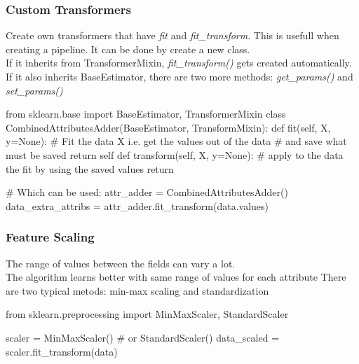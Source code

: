     \subsubsection*{Custom Transformers}
      Create own transformers that have \emph{fit} and \emph{fit\_transform}. This is usefull when creating a pipeline. It can be done by create a new class.\\
      If it inherits from TransformerMixin, \emph{fit\_transform()} gets created automatically.
      If it also inherits BaseEstimator, there are two more methods: \emph{get\_params()} and \emph{set\_params()}

      \begin{python}
        from sklearn.base import BaseEstimator, TransformerMixin
        class CombinedAttributesAdder(BaseEstimator, TransformMixin):
        def fit(self, X, y=None):
          # Fit the data X i.e. get the values out of the data
          # and save what must be saved
          return self
          def transform(self, X, y=None):
          # apply to the data the fit by using the saved values
          return

          # Which can be used:
          attr_adder = CombinedAttributesAdder()
          data_extra_attribs = attr_adder.fit_transform(data.values)
      \end{python}

    \subsubsection*{Feature Scaling}
    The range of values between the fields can vary a lot.\\
    The algorithm learns better with same range of values for each attribute
    There are two typical metods: min-max scaling and standardization
    \begin{python}
      from sklearn.preprocessing import MinMaxScaler,
                                    StandardScaler

      scaler = MinMaxScaler()   # or StandardScaler()
      data_scaled = scaler.fit_transform(data)
    \end{python}

